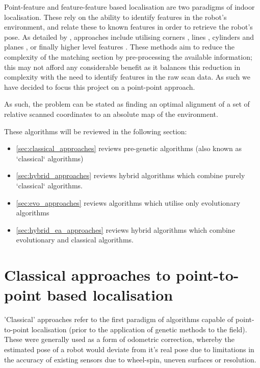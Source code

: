 \documentclass[authoryearcitations]{UoYCSproject}
\begin{document}
Point-feature and feature-feature based localisation are two paradigms of indoor localisation. These rely on the ability to identify features in the robot's environment, and relate these to known features in order to retrieve the robot's pose. As detailed by \citet{Filliat2003-ay}, approaches include utilising corners \cite{Borghi1995-pi} \cite{Hebert1996-rc}, lines \cite{Moutarlier1990-ld} \cite{Einsele1997-dl}, cylinders and planes \cite{Leonard1990-hx}, or finally higher level features \cite{Ayache1990-ok}. These methods aim to reduce the complexity of the matching section by pre-processing the available information; this may not afford any considerable benefit as it balances this reduction in complexity with the need to identify features in the raw scan data. As such we have decided to focus this project on a point-point approach.

As such, the problem can be stated as finding an optimal alignment of a set of relative scanned coordinates to an absolute map of the environment.

These algorithms will be reviewed in the following section:
\begin{itemize}
	\item \autoref{sec:classical_approaches} reviews pre-genetic algorithms (also known as `classical` algorithms)
	\item \autoref{sec:hybrid_approaches} reviews hybrid algorithms which combine purely `classical` algorithms.
	\item \autoref{sec:evo_approaches} reviews algorithms which utilise only evolutionary algorithms
	\item \autoref{sec:hybrid_ea_approaches} reviews hybrid algorithms which combine evolutionary and classical algorithms.
\end{itemize}


\section{Classical approaches to point-to-point based localisation}
\label{sec:classical_approaches}

\color{red}
'Classical' approaches refer to the first paradigm of algorithms capable of point-to-point localisation (prior to the application of genetic methods to the field). These were generally used as a form of odometric correction, whereby the estimated pose of a robot would deviate from it's real pose due to limitations in the accuracy of existing sensors due to wheel-spin, uneven surfaces or resolution.
\newline
\color{black}
\end{document}
